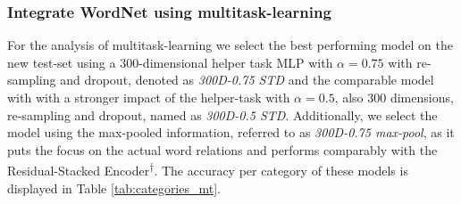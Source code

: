 \subsubsection{Integrate WordNet using multitask-learning}
For the analysis of multitask-learning we select the best performing model on the new test-set using a 300-dimensional helper task \ac{MLP} with $\alpha=0.75$ with re-sampling and dropout, denoted as \textit{300D-0.75 STD} and the comparable model with with a stronger impact of the helper-task with $\alpha=0.5$, also 300 dimensions, re-sampling and dropout, named as \textit{300D-0.5 STD}. Additionally, we select the model using the max-pooled information, referred to as \textit{300D-0.75 max-pool}, as it puts the focus on the actual word relations and performs comparably with the Residual-Stacked Encoder\textsuperscript{$\dagger$}. The accuracy per category of these models is displayed in Table \ref{tab:categories_mt}.
